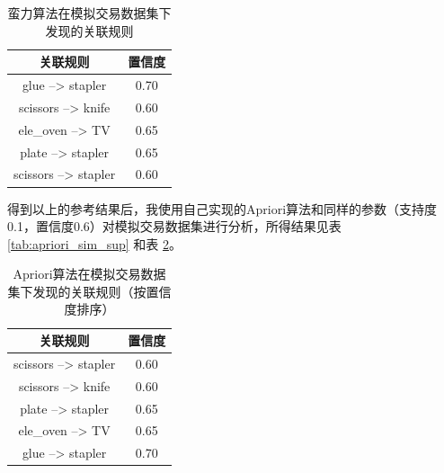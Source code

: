 \documentclass[12pt,a4paper]{article}
\theoremstyle{definition}
\begin{document}
\begin{table}[H]
	\renewcommand\arraystretch{1.35}
	\caption{蛮力算法在模拟交易数据集下发现的关联规则}
	\label{tab:baoli_sim_con}
	\centering
	
	\begin{tabular}{c|c}
		\centering
		关联规则 & 置信度 \\
		\hline
		glue --> stapler & 0.70 \\
		scissors --> knife & 0.60 \\
		ele\_oven --> TV & 0.65 \\
		plate --> stapler & 0.65 \\
		scissors --> stapler & 0.60 \\
	\end{tabular}
\end{table}

得到以上的参考结果后，我使用自己实现的Apriori算法和同样的参数（支持度0.1，置信度0.6）对模拟交易数据集进行分析，所得结果见表 \ref{tab:apriori_sim_sup} 和表 \ref{tab:apriori_sim_con}。

\begin{table}[H]
	\renewcommand\arraystretch{1.35}
	\caption{Apriori算法在模拟交易数据集下发现的关联规则（按置信度排序）}
	\label{tab:apriori_sim_con}
	\centering
	
	\begin{tabular}{c|c}
		\centering
		关联规则 & 置信度 \\
		\hline
		scissors --> stapler & 0.60 \\
		scissors --> knife & 0.60 \\
		plate --> stapler & 0.65 \\
		ele\_oven --> TV & 0.65 \\
		glue --> stapler & 0.70 \\
	\end{tabular}
\end{table}
\end{document}
